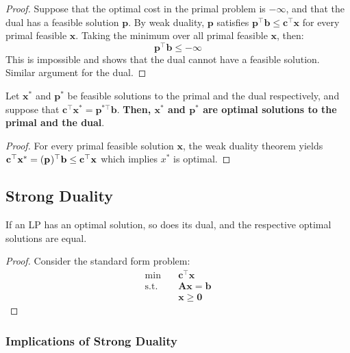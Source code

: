 \documentclass{article}
\begin{document}
\begin{proof}
    Suppose that the optimal cost in the primal problem is $-\infty$, and that the dual has a feasible solution $ \mathbf{p}$. By weak duality, $ \mathbf{p}$ satisfies $ \mathbf{p}^{\top}\mathbf{b} \leq \mathbf{c}^{\top}\mathbf{x}$ for every primal feasible $ \mathbf{x}$. Taking the minimum over all primal feasible $ \mathbf{x}$, then: \begin{equation*}
        \mathbf{p}^{\top}\mathbf{b} \leq -\infty
    \end{equation*} This is impossible and shows that the dual cannot have a feasible solution. Similar argument for the dual. 
\end{proof}

\begin{theorem}
    Let $ \mathbf{x}^{*}$ and $\mathbf{p}^{*}$ be feasible solutions to the primal and the dual respectively, and suppose that $\mathbf{c}^{\top}\mathbf{x}^{*} = \mathbf{p}^{*\top}\mathbf{b}$. \textbf{Then, $\mathbf{x}^{*}$ and $\mathbf{p}^{*}$ are optimal solutions to the primal and the dual}.  
\end{theorem}
\begin{proof}
    For every primal feasible solution $\mathbf{x}$, the weak duality theorem yields $\mathbf{c}^{\top}\mathbf{x}^{*} = (\mathbf{p}^{\*})^{\top}\mathbf{b} \leq \mathbf{c}^{\top}\mathbf{x}$ which implies $x^{*}$ is optimal. 
\end{proof}

\subsection{Strong Duality}
\begin{theorem}
    If an LP has an optimal solution, so does its dual, and the respective optimal solutions are equal.
\end{theorem}
\begin{proof}
    Consider the standard form problem: \begin{align*}
        \min \quad & \mathbf{c}^{\top}\mathbf{x} \\ 
        \text{s.t.} \quad & \mathbf{Ax} = \mathbf{b} \\ 
        & \mathbf{x} \geq \mathbf{0}
    \end{align*} 
\end{proof}

\subsubsection{Implications of Strong Duality}
\end{document}
